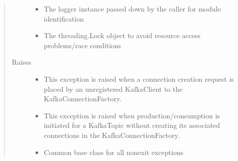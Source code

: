 \documentclass[letterpaper,10pt,english]{sphinxmanual}
\begin{document}
\begin{fulllineitems}
\begin{quote}
\begin{description}
\begin{itemize}
\item {} 
\sphinxAtStartPar
{} \textendash{} The logger instance passed down by the caller for module identification

\item {} 
\sphinxAtStartPar
{} \textendash{} The threading.Lock object to avoid resource access problems/race conditions

\end{itemize}

\item[{Raises}] \leavevmode\begin{itemize}
\item {} 
\sphinxAtStartPar
{\hyperref[\detokenize{Forge:Forge.KafkaClientNotRegisteredError}]{}} \textendash{} This exception is raised when a connection creation request is placed by an
    unregistered KafkaClient to the KafkaConnectionFactory.

\item {} 
\sphinxAtStartPar
{\hyperref[\detokenize{Forge:Forge.KafkaUnknownConnectionError}]{}} \textendash{} This exception is raised when production/consumption is initiated for a KafkaTopic
    without creating its associated connections in the KafkaConnectionFactory.

\item {} 
\sphinxAtStartPar
{} \textendash{} Common base class for all non\sphinxhyphen{}exit exceptions

\end{itemize}

\end{description}\end{quote}

\end{fulllineitems}

\end{document}
